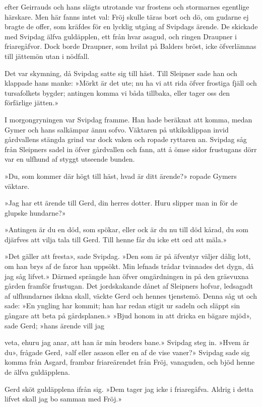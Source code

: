 efter Geirrauds och hans slägts utrotande var frostens och stormarnes
egentlige härskare. Men här fanns intet val: Fröj skulle täras bort och
dö, om gudarne ej bragte de offer, som kräfdes för en lycklig utgång af
Svipdags ärende. De skickade med Svipdag älfva guldäpplen, ett från hvar
asagud, och ringen Draupner i friaregåfvor. Dock borde Draupner, som
hvilat på Balders bröst, icke öfverlämnas till jättemön utan i nödfall.

Det var skymning, då Svipdag satte sig till häst. Till Sleipner sade han
och klappade hans manke: »Mörkt är det ute; nu ha vi att rida öfver
frostiga fjäll och tursafolkets bygder; antingen komma vi båda tillbaka,
eller tager oss den förfärlige jätten.»

I morgongryningen var Svipdag framme. Han hade beräknat att komma, medan
Gymer och hans salkämpar ännu sofvo. Väktaren på utkiksklippan invid
gårdvallens stängda grind var dock vaken och ropade ryttaren an. Svipdag
såg från Sleipners sadel in öfver gårdvallen och fann, att å ömse sidor
frustugans dörr var en ulfhund af styggt utseende bunden.

»Du, som kommer där högt till häst, hvad är ditt ärende?» ropade Gymers
väktare.

»Jag har ett ärende till Gerd, din herres dotter. Huru slipper man in
för de glupske hundarne?»

»Antingen är du en död, som spökar, eller ock är du nu till död kårad,
du som djärfves att vilja tala till Gerd. Till henne får du icke ett ord
att mäla.»

»Det gäller att fresta», sade Svipdag. »Den som är på äfventyr väljer
dålig lott, om han brys af de faror han uppsökt. Min lefnads trådar
tvinnades det dygn, då jag såg lifvet.» Därmed sprängde han öfver
omgärdningen in på den gräsvuxna gården framför frustugan. Det
jordskakande dånet af Sleipners hofvar, ledsagadt af ulfhundarnes ilskna
skall, väckte Gerd och hennes tjenstemö. Denna såg ut och sade: »En
yngling har kommit; han har redan stigit ur sadeln och släppt sin
gångare att beta på gårdsplanen.» »Bjud honom in att dricka en bägare
mjöd», sade Gerd; »hans ärende vill jag

veta, ehuru jag anar, att han är min broders bane.» Svipdag steg in.
»Hvem är du», frågade Gerd, »alf eller asason eller en af de vise
vaner?» Svipdag sade sig komma från Asgard, frambar friareärendet från
Fröj, vanaguden, och bjöd henne de älfva guldäpplena.

Gerd sköt guldäpplena ifrån sig. »Dem tager jag icke i friaregåfva.
Aldrig i detta lifvet skall jag bo samman med Fröj.»

